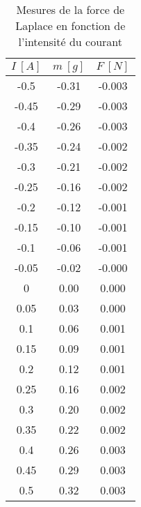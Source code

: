 \documentclass[11pt]{article}
\begin{document}
\begin{minipage}{.6\textwidth}
\begin{table}[H]
            \begin{tabular}{|c|c|c|}
                \hline
                \rowcolor{gray} $I \ [A]$ & $m \ [g]$ & $F \ [N]$ \\
                \hline
                -0.5 & -0.31 & -0.003 \\
                \hline
                -0.45 & -0.29 & -0.003 \\
                \hline
                -0.4 & -0.26 & -0.003 \\
                \hline
                -0.35 & -0.24 & -0.002 \\
                \hline
                -0.3 & -0.21 & -0.002 \\
                \hline
                -0.25 & -0.16 & -0.002 \\
                \hline
                -0.2 & -0.12 & -0.001 \\
                \hline
                -0.15 & -0.10 & -0.001 \\
                \hline
                -0.1 & -0.06 & -0.001 \\
                \hline
                -0.05 & -0.02 & -0.000 \\
                \hline
                0 & 0.00 & 0.000 \\
                \hline
                0.05 & 0.03 & 0.000 \\
                \hline
                0.1 & 0.06 & 0.001 \\
                \hline
                0.15 & 0.09 & 0.001 \\
                \hline
                0.2 & 0.12 & 0.001 \\
                \hline
                0.25 & 0.16 & 0.002 \\
                \hline
                0.3 & 0.20 & 0.002 \\
                \hline
                0.35 & 0.22 & 0.002 \\
                \hline
                0.4 & 0.26 & 0.003 \\
                \hline
                0.45 & 0.29 & 0.003 \\
                \hline
                0.5 & 0.32 & 0.003 \\
                \hline
            \end{tabular}
            \caption{Mesures de la force de Laplace en fonction de l'intensité du courant}
            \label{tab:mesure-cour}
        \end{table}
    \end{minipage}
\end{document}
